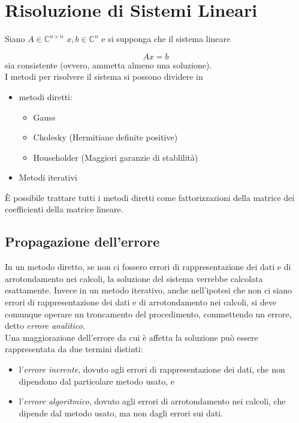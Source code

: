 

\inbpdocument 

\chapter{Risoluzione di Sistemi Lineari}

Siano $A \in \mathbb{C}^{n \times n}$ $x,b \in \mathbb{C}^{n}$ e si
supponga che il sistema lineare

$$Ax = b$$
sia consistente (ovvero, ammetta almeno una soluzione).\\ 
I metodi per risolvere il sistema si possono dividere in
\begin{itemize}
\item metodi diretti:
  \begin{itemize}
  \item Gauss
  \item Cholesky (Hermitiane definite positive)
  \item Householder (Maggiori garanzie di stablilit\`a)
  \end{itemize}
\item Metodi iterativi
\end{itemize}

\begin{notes}
  È possibile trattare tutti i metodi diretti come fattorizzazioni
  della matrice dei coefficienti della matrice lineare.
\end{notes}


\section{Propagazione dell'errore}
In un metodo diretto, se non ci fossero errori di rappresentazione dei
dati e di arrotondamento nei calcoli, la soluzione del sistema
verrebbe calcolata esattamente. Invece in un metodo iterativo, anche
nell’ipotesi che non ci siano errori di rappresentazione dei dati e di
arrotondamento nei calcoli, si deve comunque operare un troncamento
del procedimento, commettendo un errore, detto \emph{errore analitico}.\\

Una maggiorazione dell’errore da cui \`e affetta la soluzione può essere
rappresentata da due termini distinti:
\begin{itemize}
\item l'\emph{errore inerente}, dovuto agli errori di rappresentazione dei dati,
che non dipendono dal particolare metodo usato, e
\item l'\emph{errore algoritmico}, dovuto agli errori di arrotondamento nei calcoli,
che dipende dal metodo usato, ma non dagli errori sui dati.
\end{itemize}

